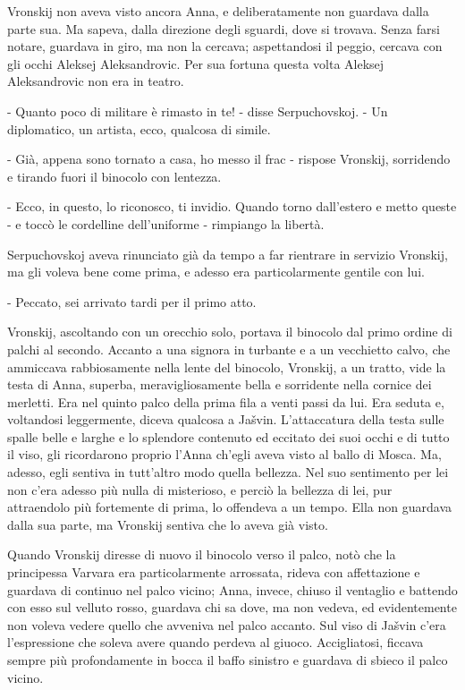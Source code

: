 Vronskij non aveva visto ancora Anna, e deliberatamente non guardava dalla parte sua. Ma sapeva, dalla direzione degli sguardi, dove si trovava. Senza farsi notare, guardava in giro, ma non la cercava; aspettandosi il peggio, cercava con gli occhi Aleksej Aleksandrovic. Per sua fortuna questa volta Aleksej Aleksandrovic non era in teatro. 

- Quanto poco di militare è rimasto in te! - disse Serpuchovskoj. - Un diplomatico, un artista, ecco, qualcosa di simile. 

- Già, appena sono tornato a casa, ho messo il frac - rispose Vronskij, sorridendo e tirando fuori il binocolo con lentezza. 

- Ecco, in questo, lo riconosco, ti invidio. Quando torno dall'estero e metto queste - e toccò le cordelline dell'uniforme - rimpiango la libertà. 

Serpuchovskoj aveva rinunciato già da tempo a far rientrare in servizio Vronskij, ma gli voleva bene come prima, e adesso era particolarmente gentile con lui. 

- Peccato, sei arrivato tardi per il primo atto. 

Vronskij, ascoltando con un orecchio solo, portava il binocolo dal primo ordine di palchi al secondo. Accanto a una signora in turbante e a un vecchietto calvo, che ammiccava rabbiosamente nella lente del binocolo, Vronskij, a un tratto, vide la testa di Anna, superba, meravigliosamente bella e sorridente nella cornice dei merletti. Era nel quinto palco della prima fila a venti passi da lui. Era seduta e, voltandosi leggermente, diceva qualcosa a Jašvin. L'attaccatura della testa sulle spalle belle e larghe e lo splendore contenuto ed eccitato dei suoi occhi e di tutto il viso, gli ricordarono proprio l'Anna ch'egli aveva visto al ballo di Mosca. Ma, adesso, egli sentiva in tutt'altro modo quella bellezza. Nel suo sentimento per lei non c'era adesso più nulla di misterioso, e perciò la bellezza di lei, pur attraendolo più fortemente di prima, lo offendeva a un tempo. Ella non guardava dalla sua parte, ma Vronskij sentiva che lo aveva già visto. 

Quando Vronskij diresse di nuovo il binocolo verso il palco, notò che la principessa Varvara era particolarmente arrossata, rideva con affettazione e guardava di continuo nel palco vicino; Anna, invece, chiuso il ventaglio e battendo con esso sul velluto rosso, guardava chi sa dove, ma non vedeva, ed evidentemente non voleva vedere quello che avveniva nel palco accanto. Sul viso di Jašvin c'era l'espressione che soleva avere quando perdeva al giuoco. Accigliatosi, ficcava sempre più profondamente in bocca il baffo sinistro e guardava di sbieco il palco vicino. 

